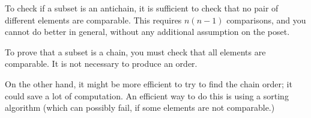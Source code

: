 
\begin{hint}
    To check if a subset is an antichain, it is sufficient to check that no pair of different elements are comparable.
    This requires $n(n-1)$ comparisons, and you cannot do better in general, without any additional assumption on the poset.
\end{hint}

\begin{hint}
    To prove that a subset is a chain, you must check that all elements are comparable.
    It is not necessary to produce an order.
\end{hint}
\begin{hint}
    On the other hand, it might be more efficient to try to find the chain order; it could save a lot of computation.
    An efficient way to do this is using a sorting algorithm (which can possibly fail, if some elements are not comparable.)
\end{hint}